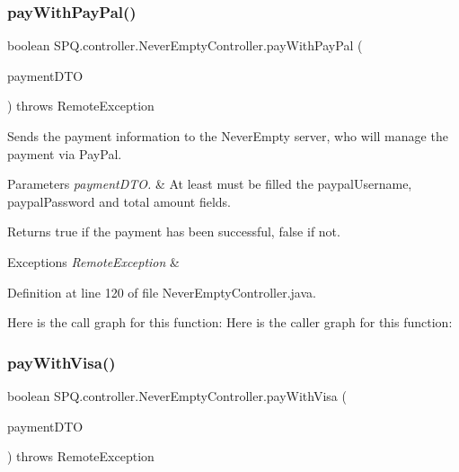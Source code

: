 \subsubsection{\texorpdfstring{pay\+With\+Pay\+Pal()}{payWithPayPal()}}
{\footnotesize\ttfamily boolean S\+P\+Q.\+controller.\+Never\+Empty\+Controller.\+pay\+With\+Pay\+Pal (\begin{DoxyParamCaption}\item[{\mbox{\hyperlink{class_s_p_q_1_1dto_1_1_payment_d_t_o}{Payment\+D\+TO}}}]{payment\+D\+TO }\end{DoxyParamCaption}) throws Remote\+Exception}

Sends the payment information to the Never\+Empty server, who will manage the payment via Pay\+Pal. 
\begin{DoxyParams}{Parameters}
{\em payment\+D\+T\+O.} & At least must be filled the paypal\+Username, paypal\+Password and total amount fields. \\
\hline
\end{DoxyParams}
\begin{DoxyReturn}{Returns}
true if the payment has been successful, false if not. 
\end{DoxyReturn}

\begin{DoxyExceptions}{Exceptions}
{\em Remote\+Exception} & \\
\hline
\end{DoxyExceptions}


Definition at line 120 of file Never\+Empty\+Controller.\+java.

Here is the call graph for this function\+:
Here is the caller graph for this function\+:
\mbox{\label{class_s_p_q_1_1controller_1_1_never_empty_controller_a79b4d6042b76ad3aee7f11d104d813d6}} 
\subsubsection{\texorpdfstring{pay\+With\+Visa()}{payWithVisa()}}
{\footnotesize\ttfamily boolean S\+P\+Q.\+controller.\+Never\+Empty\+Controller.\+pay\+With\+Visa (\begin{DoxyParamCaption}\item[{\mbox{\hyperlink{class_s_p_q_1_1dto_1_1_payment_d_t_o}{Payment\+D\+TO}}}]{payment\+D\+TO }\end{DoxyParamCaption}) throws Remote\+Exception}

